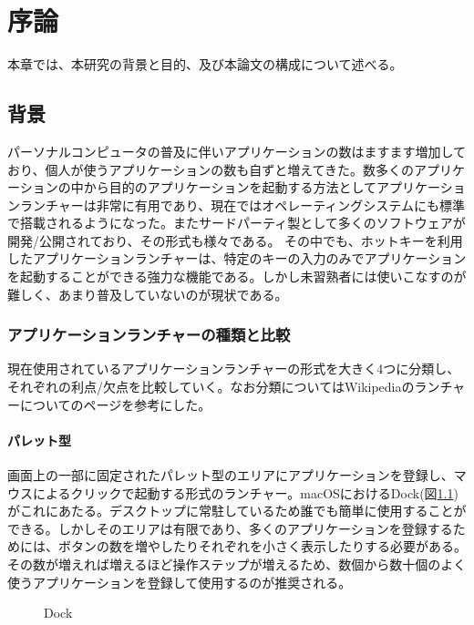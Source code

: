 \chapter{序論}
\label{chap:introduction}

本章では、本研究の背景と目的、及び本論文の構成について述べる。

\newpage

\section{背景}
パーソナルコンピュータの普及に伴いアプリケーションの数はますます増加しており、個人が使うアプリケーションの数も自ずと増えてきた。数多くのアプリケーションの中から目的のアプリケーションを起動する方法としてアプリケーションランチャーは非常に有用であり、現在ではオペレーティングシステムにも標準で搭載されるようになった。またサードパーティ製として多くのソフトウェアが開発/公開されており、その形式も様々である。
その中でも、ホットキーを利用したアプリケーションランチャーは、特定のキーの入力のみでアプリケーションを起動することができる強力な機能である。しかし未習熟者には使いこなすのが難しく、あまり普及していないのが現状である。

\subsection{アプリケーションランチャーの種類と比較}
現在使用されているアプリケーションランチャーの形式を大きく4つに分類し、それぞれの利点/欠点を比較していく。なお分類についてはWikipediaのランチャーについてのページを参考にした。\cite{wikilauncher}

\subsubsection{パレット型}

画面上の一部に固定されたパレット型のエリアにアプリケーションを登録し、マウスによるクリックで起動する形式のランチャー。macOSにおけるDock(図\ref{fig:dock})がこれにあたる。デスクトップに常駐しているため誰でも簡単に使用することができる。しかしそのエリアは有限であり、多くのアプリケーションを登録するためには、ボタンの数を増やしたりそれぞれを小さく表示したりする必要がある。その数が増えれば増えるほど操作ステップが増えるため、数個から数十個のよく使うアプリケーションを登録して使用するのが推奨される。

\begin{figure}[h]
    \begin{center}
    \end{center}
    \caption{Dock}
    \label{fig:dock}
\end{figure}

